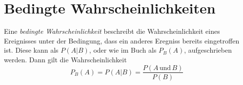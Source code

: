 \documentclass{article}
\begin{document}
 
\section{Bedingte Wahrscheinlichkeiten}
Eine \emph{bedingte Wahrscheinlichkeit} beschreibt die Wahrscheinlichkeit eines Ereignisses unter der Bedingung, dass ein anderes Eregniss bereits eingetroffen ist. Diese kann als $P(A|B)$, oder wie im Buch als $P_B(A)$, aufgeschrieben werden. Dann gilt die Wahrscheinlichkeit 
\[ 
 P_B(A) = P(A|B) = \frac{P(A \,\text{und}\, B)}{P(B)}
\] 
\end{document}
